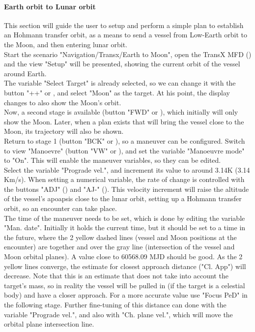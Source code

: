 \documentclass[Orbiter User Manual.tex]{subfiles}
\begin{document}
\paragraph{Earth orbit to Lunar orbit}
This section will guide the user to setup and perform a simple plan to establish an Hohmann transfer orbit, as a means to send a vessel from Low-Earth orbit to the Moon, and then entering lunar orbit.\\
Start the scenario "Navigation/Transx/Earth to Moon", open the TransX MFD (\Shift{}) and the view "Setup" will be presented, showing the current orbit of the vessel around Earth.\\
The variable "Select Target" is already selected, so we can change it with the button "++" or \Shift\keystroke{=}, and select "Moon" as the target. At his point, the display changes to also show the Moon's orbit.\\
Now, a second stage is available (button "FWD" or \Shift{}), which initially will only show the Moon. Later, when a plan exists that will bring the vessel close to the Moon, its trajectory will also be shown.\\
Return to stage 1 (button "BCK" or \Shift{}), so a maneuver can be configured. Switch to view "Manoevre" (button "VW" or \Shift{}), and set the variable "Manoeuvre mode" to "On". This will enable the maneuver variables, so they can be edited.\\
Select the variable "Prograde vel.", and increment its value to around 3.14K (3.14 Km/s). When setting a numerical variable, the rate of change is controlled with the buttons "ADJ" (\Shift\keystroke{\{}) and "AJ-" (\Shift\keystroke{\}}). This velocity increment will raise the altitude of the vessel's apoapsis close to the lunar orbit, setting up a Hohmann transfer orbit, so an encounter can take place.\\
The time of the maneuver needs to be set, which is done by editing the variable "Man. date". Initially it holds the current time, but it should be set to a time in the future, where the 2 yellow dashed lines (vessel and Moon positions at the encounter) are together and over the gray line (intersection of the vessel and Moon orbital planes). A value close to 60568.09 MJD should be good. As the 2 yellow lines converge, the estimate for closest approach distance ("Cl. App") will decrease. Note that this is an estimate that does not take into account the target's mass, so in reality the vessel will be pulled in (if the target is a celestial body) and have a closer approach. For a more accurate value use "Focus PeD" in the following stage. Further fine-tuning of this distance can done with the variable "Prograde vel.", and also with "Ch. plane vel.", which will move the orbital plane intersection line.\\
\end{document}
